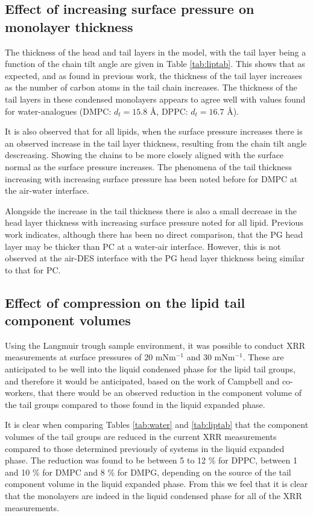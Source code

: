 \documentclass[twoside,twocolumn,9pt]{article}
\begin{document}
\subsection{Effect of increasing surface pressure on monolayer thickness}
The thickness of the head and tail layers in the model, with the tail layer being a function of the chain tilt angle are given in Table \ref{tab:liptab}. This shows that as expected, and as found in previous work,\cite{Mohwald1990,Vaknin1991} the thickness of the tail layer increases as the number of carbon atoms in the tail chain increases. The thickness of the tail layers in these condensed monolayers appears to agree well with values found for water-analogues (DMPC: $d_t=15.8$ \AA,\cite{Johnson1991} DPPC: $d_t=16.7$ \AA\cite{Helm1987}).

It is also observed that for all lipids, when the surface pressure increases there is an observed increase in the tail layer thickness, resulting from the chain tilt angle descreasing. Showing the chains to be more closely aligned with the surface normal as the surface pressure increases. The phenomena of the tail thickness increasing with increasing surface pressure has been noted before for DMPC at the air-water interface.\cite{Bayerl1990}

Alongside the increase in the tail thickness there is also a small decrease in the head layer thickness with increasing surface pressure noted for all lipid. Previous work indicates, although there has been no direct comparison, that the PG head layer may be thicker than PC at a water-air interface.\cite{Clifton2012,Johnson1991,Vaknin1991,Lawrie2000} However, this is not observed at the air-DES interface with the PG head layer thickness being similar to that for PC.

\subsection{Effect of compression on the lipid tail component volumes}
Using the Langmuir trough sample environment, it was possible to conduct XRR measurements at surface pressures of 20 mNm$^{-1}$ and 30 mNm$^{-1}$. These are anticipated to be well into the liquid condensed phase for the lipid tail groups, and therefore it would be anticipated, based on the work of Campbell and co-workers,\cite{Campbell2018} that there would be an observed reduction in the component volume of the tail groups compared to those found in the liquid expanded phase. 

It is clear when comparing Tables \ref{tab:water} and \ref{tab:liptab} that the component volumes of the tail groups are reduced in the current XRR measurements compared to those determined previously of systems in the liquid expanded phase. The reduction was found to be between 5 to 12 \% for DPPC, between 1 and 10 \% for DMPC and 8 \% for DMPG, depending on the source of the tail component volume in the liquid expanded phase. From this we feel that it is clear that the monolayers are indeed in the liquid condensed phase for all of the XRR measurements. 
\end{document}
